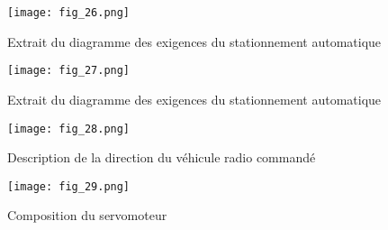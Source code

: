 \begin{figure}[H]
\centering
\texttt{[image: fig\_26.png]}
\caption{Extrait du diagramme des exigences du stationnement automatique \label{fig_26}}
\end{figure}


\begin{figure}[H]
\centering
\texttt{[image: fig\_27.png]}
\caption{Extrait du diagramme des exigences du stationnement automatique \label{fig_27}}
\end{figure}


\begin{figure}[H]
\centering
\texttt{[image: fig\_28.png]}
\caption{Description de la direction du véhicule radio commandé \label{fig_28}}
\end{figure}


\begin{figure}[H]
\centering
\texttt{[image: fig\_29.png]}
\caption{Composition du servomoteur \label{fig_29}}
\end{figure}